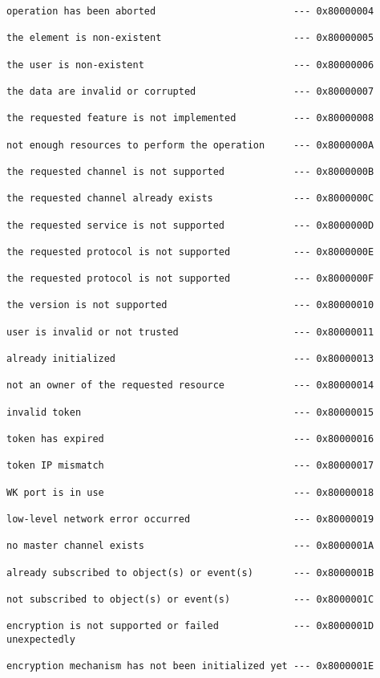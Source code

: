 \documentclass[titlepage,oneside]{book}
\begin{document}
\begin{verbatim}
operation has been aborted                        --- 0x80000004

the element is non-existent                       --- 0x80000005

the user is non-existent                          --- 0x80000006

the data are invalid or corrupted                 --- 0x80000007

the requested feature is not implemented          --- 0x80000008

not enough resources to perform the operation     --- 0x8000000A

the requested channel is not supported            --- 0x8000000B

the requested channel already exists              --- 0x8000000C

the requested service is not supported            --- 0x8000000D

the requested protocol is not supported           --- 0x8000000E

the requested protocol is not supported           --- 0x8000000F

the version is not supported                      --- 0x80000010

user is invalid or not trusted                    --- 0x80000011

already initialized                               --- 0x80000013

not an owner of the requested resource            --- 0x80000014

invalid token                                     --- 0x80000015

token has expired                                 --- 0x80000016

token IP mismatch                                 --- 0x80000017

WK port is in use                                 --- 0x80000018

low-level network error occurred                  --- 0x80000019

no master channel exists                          --- 0x8000001A

already subscribed to object(s) or event(s)       --- 0x8000001B

not subscribed to object(s) or event(s)           --- 0x8000001C

encryption is not supported or failed             --- 0x8000001D
unexpectedly

encryption mechanism has not been initialized yet --- 0x8000001E


\end{verbatim}
\end{document}
